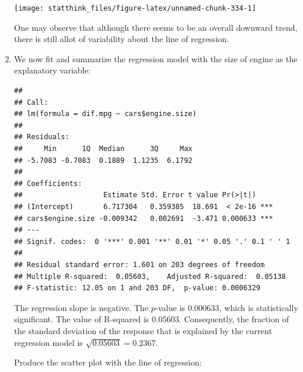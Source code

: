\documentclass[
]{krantz}
\makeatletter
\newenvironment{Shaded}{\begin{snugshade}}{\end{snugshade}}
\newcommand{\KeywordTok}[1]{\textcolor[rgb]{0.13,0.29,0.53}{\textbf{#1}}}
\newcommand{\NormalTok}[1]{#1}
\newcommand{\OperatorTok}[1]{\textcolor[rgb]{0.81,0.36,0.00}{\textbf{#1}}}
\newcommand{\StringTok}[1]{\textcolor[rgb]{0.31,0.60,0.02}{#1}}
\newenvironment{kframe}{%
\medskip{}
\setlength{\fboxsep}{.8em}
 \def\at@end@of@kframe{}%
 \ifinner\ifhmode%
  \def\at@end@of@kframe{\end{minipage}}%
  \begin{minipage}{\columnwidth}%
 \fi\fi%
 \def\FrameCommand##1{\hskip\@totalleftmargin \hskip-\fboxsep
 \colorbox{shadecolor}{##1}\hskip-\fboxsep
     \hskip-\linewidth \hskip-\@totalleftmargin \hskip\columnwidth}%
 \MakeFramed {\advance\hsize-\width
   \@totalleftmargin\z@ \linewidth\hsize
   \@setminipage}}%
 {\par\unskip\endMakeFramed%
 \at@end@of@kframe}
\renewenvironment{Shaded}{\begin{kframe}}{\end{kframe}}
\theoremstyle{definition}
\theoremstyle{definition}
\theoremstyle{definition}
\theoremstyle{remark}
\makeatother
\begin{document}
\begin{enumerate}
  \begin{center}\texttt{[image: statthink\_files/figure-latex/unnamed-chunk-334-1]} \end{center}

  One may observe that although there seems
  to be an overall downward trend, there is still allot of variability
  about the line of regression.
\item
  We now fit and summarize the
  regression model with the size of engine as the explanatory variable:

\begin{Shaded}
\end{Shaded}

\begin{verbatim}
## 
## Call:
## lm(formula = dif.mpg ~ cars$engine.size)
## 
## Residuals:
##     Min      1Q  Median      3Q     Max 
## -5.7083 -0.7083  0.1889  1.1235  6.1792 
## 
## Coefficients:
##                   Estimate Std. Error t value Pr(>|t|)    
## (Intercept)       6.717304   0.359385  18.691  < 2e-16 ***
## cars$engine.size -0.009342   0.002691  -3.471 0.000633 ***
## ---
## Signif. codes:  0 '***' 0.001 '**' 0.01 '*' 0.05 '.' 0.1 ' ' 1
## 
## Residual standard error: 1.601 on 203 degrees of freedom
## Multiple R-squared:  0.05603,    Adjusted R-squared:  0.05138 
## F-statistic: 12.05 on 1 and 203 DF,  p-value: 0.0006329
\end{verbatim}

  The regression slope is negative. The \(p\)-value is \(0.000633\), which is
  statistically significant. The value of R-squared is \(0.05603\).
  Consequently, the fraction of the standard deviation of the response
  that is explained by the current regression model is
  \(\sqrt{0.05603}= 0.2367\).

  Produce the scatter plot with the line of regression:

\begin{Shaded}
\end{Shaded}


\end{enumerate}
\end{document}
